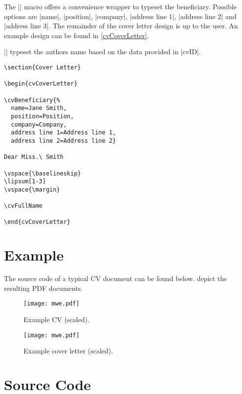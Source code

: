 \documentclass{ltxdoc}
\begin{document}
  \DescribeMacro{\cvBeneficiary}
  The || macro offers a convenience wrapper to typeset the beneficiary. Possible options are |name|, |position|, |company|, |address line 1|, |address line 2| and |address line 3|. The remainder of the cover letter design is up to the user. An example design can be found in \cref{cvCoverLetter}.
  
  \DescribeMacro{\cvFullName}
  |\cvFullName| typeset the authors name based on the data provided in |cvID|. 

  \begin{lstlisting}[caption={\lstinline!cvCoverLetter! code example.},label=cvCoverLetter]
\section{Cover Letter}

\begin{cvCoverLetter}

\cvBeneficiary{%
  name=Jane Smith,
  position=Position,
  company=Company,
  address line 1=Address line 1,
  address line 2=Address line 2}

Dear Miss.\ Smith

\vspace{\baselineskip}
\lipsum[1-3]
\vspace{\margin}

\cvFullName

\end{cvCoverLetter}
  \end{lstlisting}

\section{Example}

  The source code of a typical CV document can be found below.  depict the resulting PDF documents.

  \begin{figure}[!ht]
    \texttt{[image: mwe.pdf]}
    \caption{Example CV (scaled).}
    \label{example-cv}
  \end{figure}

  \begin{figure}[!ht]
    \texttt{[image: mwe.pdf]}
    \caption{Example cover letter (scaled).}
    \label{example-cover-letter}
  \end{figure}

  

\section{Source Code}



\PrintIndex
\end{document}
